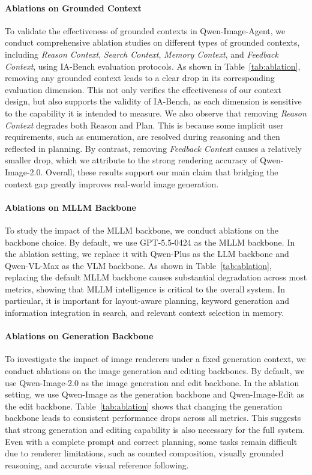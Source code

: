 \documentclass{llmxive}
\begin{document}
\paragraph{Ablations on Grounded Context}
To validate the effectiveness of grounded contexts in Qwen-Image-Agent, we conduct comprehensive ablation studies on different types of grounded contexts, including \textit{Reason Context}, \textit{Search Context}, \textit{Memory Context}, and \textit{Feedback Context}, using IA-Bench evaluation protocols. As shown in Table~\ref{tab:ablation}, removing any grounded context leads to a clear drop in its corresponding evaluation dimension. This not only verifies the effectiveness of our context design, but also supports the validity of IA-Bench, as each dimension is sensitive to the capability it is intended to measure. We also observe that removing \textit{Reason Context} degrades both Reason and Plan. This is because some implicit user requirements, such as enumeration, are resolved during reasoning and then reflected in planning. By contrast, removing \textit{Feedback Context} causes a relatively smaller drop, which we attribute to the strong rendering accuracy of Qwen-Image-2.0. Overall, these results support our main claim that bridging the context gap greatly improves real-world image generation.

\paragraph{Ablations on MLLM Backbone}
To study the impact of the MLLM backbone, we conduct ablations on the backbone choice. By default, we use GPT-5.5-0424 as the MLLM backbone. In the ablation setting, we replace it with Qwen-Plus as the LLM backbone and Qwen-VL-Max as the VLM backbone. As shown in Table~\ref{tab:ablation}, replacing the default MLLM backbone causes substantial degradation across most metrics, showing that MLLM intelligence is critical to the overall system. In particular, it is important for layout-aware planning, keyword generation and information integration in search, and relevant context selection in memory.

\paragraph{Ablations on Generation Backbone}
To investigate the impact of image renderers under a fixed generation context, we conduct ablations on the image generation and editing backbones. By default, we use Qwen-Image-2.0 as the image generation and edit backbone. In the ablation setting, we use Qwen-Image as the generation backbone and Qwen-Image-Edit as the edit backbone. Table~\ref{tab:ablation} shows that changing the generation backbone leads to consistent performance drops across all metrics. This suggests that strong generation and editing capability is also necessary for the full system. Even with a complete prompt and correct planning, some tasks remain difficult due to renderer limitations, such as counted composition, visually grounded reasoning, and accurate visual reference following.
\end{document}
